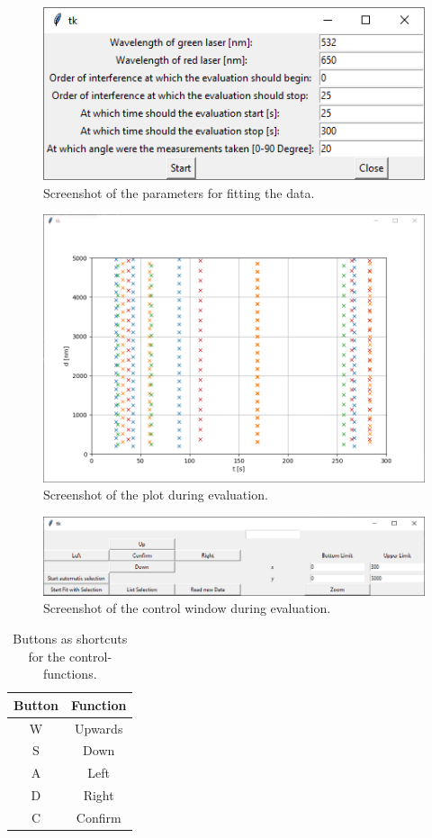 \begin{figure}
	\centering
	\includegraphics[width=0.7\linewidth]{LamellaDevice_Evaluation/Parameters}
	\caption{Screenshot of the parameters for fitting the data.}
	\label{fig:thickness_parameters}
\end{figure}

\begin{figure}
	\centering
	\includegraphics[width=0.7\linewidth]{LamellaDevice_Evaluation/Evaluation_Plot}
	\caption{Screenshot of the plot during evaluation.}
	\label{fig:evaluation_plot}
\end{figure}

\begin{figure}
	\centering
	\includegraphics[width=0.7\linewidth]{LamellaDevice_Evaluation/Evaluation_Control}
	\caption{Screenshot of the control window during evaluation.}
	\label{fig:evaluation_control}
\end{figure}

\begin{table}
	\centering
	\caption{Buttons as shortcuts for the control-functions.}
	\label{tab:shortcuts}
	\begin{tabular}{|c|c|}
		\hline
		Button & Function \\
		\hline
		W & Upwards \\
		\hline
		S & Down \\
		\hline
		A & Left \\
		\hline
		D & Right \\
		\hline
		C & Confirm \\
		\hline
	\end{tabular}
\end{table}

